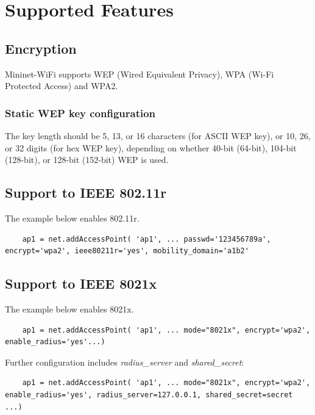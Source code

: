 \section{Supported Features}

\subsection{Encryption}
Mininet-WiFi supports WEP (Wired Equivalent Privacy), WPA (Wi-Fi Protected Access) and WPA2.

\subsubsection{Static WEP key configuration}
The key length should be 5, 13, or 16 characters (for ASCII WEP key), or 10, 26, or 32 digits (for hex WEP key), depending on whether 40-bit (64-bit), 104-bit (128-bit), or 128-bit (152-bit) WEP is used.

\subsection{Support to IEEE 802.11r}

The example below enables 802.11r.

\begin{verbatim}
    ap1 = net.addAccessPoint( 'ap1', ... passwd='123456789a', encrypt='wpa2', ieee80211r='yes', mobility_domain='a1b2'
\end{verbatim}

\subsection{Support to IEEE 8021x}

The example below enables 8021x.

\begin{verbatim}
    ap1 = net.addAccessPoint( 'ap1', ... mode="8021x", encrypt='wpa2', enable_radius='yes'...)
\end{verbatim}

\noindent Further configuration includes \textit{radius\_server} and \textit{shared\_secret}:

\begin{verbatim}
    ap1 = net.addAccessPoint( 'ap1', ... mode="8021x", encrypt='wpa2', enable_radius='yes', radius_server=127.0.0.1, shared_secret=secret ...)
\end{verbatim}

